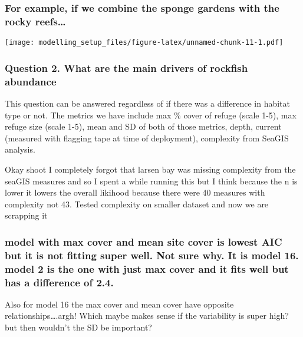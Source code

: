 \documentclass[
]{article}
\begin{document}
\hypertarget{for-example-if-we-combine-the-sponge-gardens-with-the-rocky-reefs}{%
\subsubsection{For example, if we combine the sponge gardens with the
rocky
reefs\ldots{}}\label{for-example-if-we-combine-the-sponge-gardens-with-the-rocky-reefs}}

\texttt{[image: modelling\_setup\_files/figure-latex/unnamed-chunk-11-1.pdf]}

\hypertarget{question-2.-what-are-the-main-drivers-of-rockfish-abundance}{%
\subsubsection{Question 2. What are the main drivers of rockfish
abundance}\label{question-2.-what-are-the-main-drivers-of-rockfish-abundance}}

This question can be answered regardless of if there was a difference in
habitat type or not. The metrics we have include max \% cover of refuge
(scale 1-5), max refuge size (scale 1-5), mean and SD of both of those
metrics, depth, current (measured with flagging tape at time of
deployment), complexity from SeaGIS analysis.

Okay shoot I completely forgot that larsen bay was missing complexity
from the seaGIS measures and so I spent a while running this but I think
because the n is lower it lowers the overall likihood because there were
40 measures with complexity not 43. Tested complexity on smaller dataset
and now we are scrapping it

\hypertarget{model-with-max-cover-and-mean-site-cover-is-lowest-aic-but-it-is-not-fitting-super-well.-not-sure-why.-it-is-model-16.-model-2-is-the-one-with-just-max-cover-and-it-fits-well-but-has-a-difference-of-2.4.}{%
\subsubsection{model with max cover and mean site cover is lowest AIC
but it is not fitting super well. Not sure why. It is model 16. model 2
is the one with just max cover and it fits well but has a difference of
2.4.}\label{model-with-max-cover-and-mean-site-cover-is-lowest-aic-but-it-is-not-fitting-super-well.-not-sure-why.-it-is-model-16.-model-2-is-the-one-with-just-max-cover-and-it-fits-well-but-has-a-difference-of-2.4.}}

Also for model 16 the max cover and mean cover have opposite
relationships\ldots.argh! Which maybe makes sense if the variability is
super high? but then wouldn't the SD be important?
\end{document}
